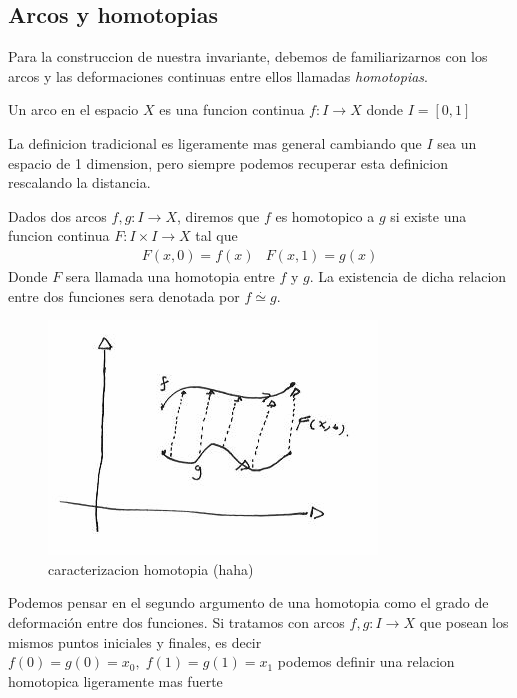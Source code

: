 \subsection{Arcos y homotopias}
Para la construccion de nuestra invariante, debemos de familiarizarnos
con los arcos y las deformaciones continuas entre ellos llamadas
\emph{homotopias}.

\begin{definicion}[arco]
  Un arco en el espacio \(X\) es una funcion continua \(f : I \to X \)
  donde \(I = [0,1]\)
\end{definicion}
La definicion tradicional es ligeramente mas general cambiando que \(I\)
sea un espacio de 1 dimension, pero siempre podemos recuperar esta
definicion rescalando la distancia.

\begin{definicion}[homotopia]
  Dados dos arcos \(f,g : I \to X\), diremos que \(f\) es homotopico a
  \(g\) si existe una funcion continua \(F : I \times I \to X \) tal que
  \[ \begin{matrix}
      F (x, 0) = f(x) & F (x, 1) = g(x)
     \end{matrix}
  \]
  Donde \(F\) sera llamada una homotopia entre \(f\) y \(g\). La
  existencia de dicha relacion entre dos funciones sera denotada por \(f
  \stackrel{.}{\simeq} g\).
\end{definicion}
\begin{figure}[h]
  \centering
  \includegraphics[scale=0.5]{./imagenes/homotopia-entre-funciones.png}
  \caption{caracterizacion homotopia (haha)}
  \label{fig:homotopia-entre-funciones}
\end{figure}
Podemos pensar en el segundo argumento de una homotopia como el grado de
deformación entre dos funciones.
Si tratamos con arcos \(f,g : I \to X\) que posean los mismos puntos
iniciales y finales, es decir \(f(0) = g(0) = x_0, \; f(1) = g(1) =
x_1 \) podemos definir una relacion homotopica ligeramente mas fuerte
